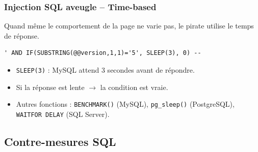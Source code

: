 \documentclass{beamer}
\begin{document}
\begin{frame}[fragile]
\frametitle{Injection SQL aveugle -- Time-based}

Quand même le comportement de la page ne varie pas, le pirate utilise le \alert{temps de réponse}.

\begin{lstlisting}[basicstyle=\ttfamily\scriptsize,frame=single]
' AND IF(SUBSTRING(@@version,1,1)='5', SLEEP(3), 0) --
\end{lstlisting}

\begin{center}
\end{center}

\begin{itemize}
\item \texttt{SLEEP(3)} : MySQL attend 3 secondes avant de répondre.
\item Si la réponse est lente $\rightarrow$ la condition est \alert{vraie}.
\item Autres fonctions : \texttt{BENCHMARK()} (MySQL), \texttt{pg\_sleep()} (PostgreSQL), \texttt{WAITFOR DELAY} (SQL Server).
\end{itemize}
\end{frame}


\subsection{Contre-mesures SQL}
\end{document}
